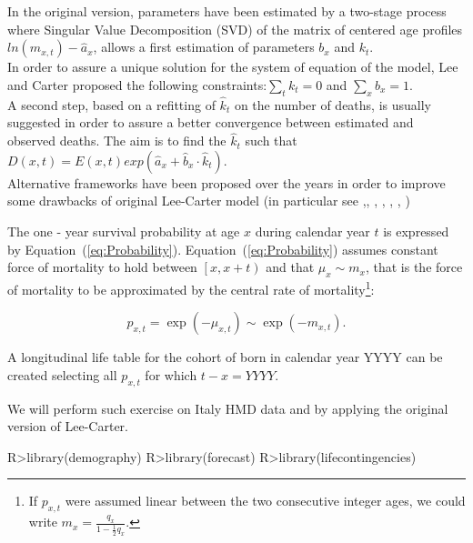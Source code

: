 \documentclass[nojss]{jss}
\begin{document}
In the original version, parameters have been estimated by a two-stage process where Singular Value Decomposition (SVD) of the matrix of centered age profiles $ln(m_{x,t})-\hat{a}_{x}$, allows a first estimation of parameters $b_{x}$ and $k_{t}$. \\
In order to assure a unique solution for the system of equation of the model, Lee and Carter proposed the following constraints:$\sum_{t}k_{t}=0$ and $\sum_{x}b_{x}=1$. \\

A second step, based on a refitting of $\hat{k}_{t}$ on the number of deaths, is usually suggested in order to assure a better convergence between estimated and observed deaths. The aim is to find the $\hat{k}_{t}$ such that $D(x,t)=E(x,t)exp(\hat{a}_{x}+\hat{b}_{x}\cdot\hat{k}_{t})$.\\

Alternative frameworks have been proposed over the years in order to improve some drawbacks of original Lee-Carter model (in particular see \cite{Al},\cite{LM}, \cite{BMS}, \cite{BDV}, \cite{RH}, \cite{CBD}, \cite{Plat})

The one - year survival probability at age $x$ during calendar year $t$ is
expressed by Equation~(\ref{eq:Probability}). Equation~(\ref{eq:Probability})
assumes constant force of mortality to hold between $\left[ x , x + t \right)$
and that $\mu_x \sim m_{x}$, that is the force of mortality to be approximated by the
central rate of mortality\footnote{If $p_{x,t}$ were assumed linear between the two consecutive integer ages, 
we could write $m_{x} = \frac {q_{x}}{1 - \frac{1}{2} q_{x}}$.}:

\begin{equation}
p_{x,t} = \exp \left(  - \mu _{x,t} \right) \sim \exp \left(  - m _{x,t} \right).
\label{eq:Probability}
\end{equation}

A longitudinal life table for the
cohort of born in calendar year YYYY can be created selecting all $p_{x,t}$ for
which $t-x=YYYY$. 

We will perform such exercise on Italy HMD data and by applying the original version of Lee-Carter.

\begin{Schunk}
\begin{Sinput}
R>library(demography)
R>library(forecast)
R>library(lifecontingencies)
\end{Sinput}
\end{Schunk}
\end{document}
